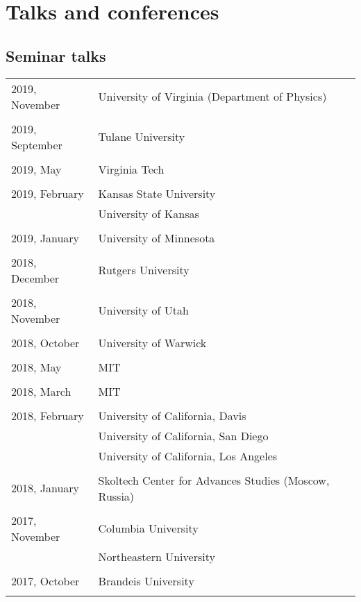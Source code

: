 \documentclass[letterpaper,11pt]{article}
\begin{document}
\section*{Talks and conferences}

\subsection*{Seminar talks}

\begin{longtable}{llc}
	2019, November
	& University of Virginia (Department of Physics)
	\\\\
	2019, September
	& Tulane University
	\\\\
	2019, May
	& Virginia Tech
	\\\\
	2019, February
	& Kansas State University \\
	& University of Kansas
	\\\\
	2019, January
	& University of Minnesota
	\\\\
	2018, December
	& Rutgers University
	\\\\
	2018, November
	& University of Utah
	\\\\
	2018, October
	& University of Warwick
	\\\\
	2018, May
	& MIT
	\\\\
	2018, March
	& MIT
	\\\\
	2018, February 
	& University of California, Davis
	\\
	& University of California, San Diego
	\\
	& University of California, Los Angeles
	\\\\
	2018, January
	& Skoltech Center for Advances Studies (Moscow, Russia)
	\\\\
	2017, November
	& Columbia University
	\\
	& Northeastern University
	\\\\
	2017, October
	& Brandeis University
	\\\\

\end{longtable}
\end{document}
